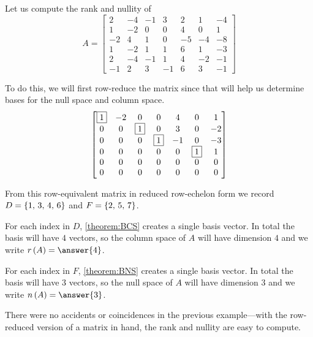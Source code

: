 \documentclass{ximera}
\begin{document}
\begin{example}
  Let us compute the rank and nullity of
  \[
    A=\begin{bmatrix}
      2 & -4 & -1 & 3 & 2 & 1 & -4\\
      1 & -2 & 0 & 0 & 4 & 0 & 1\\
      -2 & 4 & 1 & 0 & -5 & -4 & -8\\
      1 & -2 & 1 & 1 & 6 & 1 & -3\\
      2 & -4 & -1 & 1 & 4 & -2 & -1\\
      -1 & 2 & 3 & -1 & 6 & 3 & -1
    \end{bmatrix}
  \]

  To do this, we will first row-reduce the matrix since that will help us determine bases for the null space and column space.
  \[
    \begin{bmatrix}
      \fbox{1} & -2 & 0 & 0 & 4 & 0 & 1\\
      0 & 0 & \fbox{1} & 0 & 3 & 0 & -2\\
      0 & 0 & 0 & \fbox{1} & -1 & 0 & -3\\
      0 & 0 & 0 & 0 & 0 & \fbox{1} & 1\\
      0 & 0 & 0 & 0 & 0 & 0 & 0\\
      0 & 0 & 0 & 0 & 0 & 0 & 0
    \end{bmatrix}
  \]

  From this row-equivalent matrix in reduced row-echelon form we
  record $D=\left\{1,\,3,\,4,\,6\right\}$ and $F=\left\{2,\,5,\,7\right\}$.

  For each index in $D$, \ref{theorem:BCS} creates a single basis
  vector.  In total the basis will have $4$ vectors, so the column
  space of $A$ will have dimension $4$ and we write
  $\rank{A}=\answer{4}$.

  For each index in $F$, \ref{theorem:BNS} creates a single basis
  vector.  In total the basis will have $3$ vectors, so the null space
  of $A$ will have dimension $3$ and we write
  $\nullity{A}=\answer{3}$.
\end{example}

There were no accidents or coincidences in the previous example---with
the row-reduced version of a matrix in hand, the rank and nullity are
easy to compute.
\end{document}
